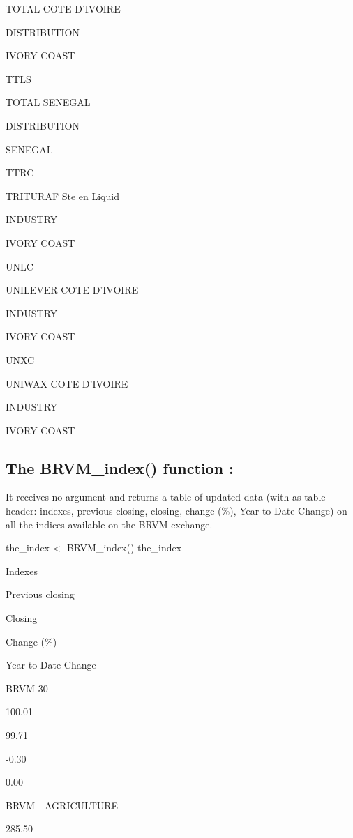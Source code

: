 \documentclass[
]{article}
\newenvironment{Shaded}{\begin{snugshade}}{\end{snugshade}}
\newcommand{\FunctionTok}[1]{\textcolor[rgb]{0.00,0.00,0.00}{#1}}
\newcommand{\NormalTok}[1]{#1}
\newcommand{\OtherTok}[1]{\textcolor[rgb]{0.56,0.35,0.01}{#1}}
\begin{document}
TOTAL COTE D'IVOIRE

DISTRIBUTION

IVORY COAST

TTLS

TOTAL SENEGAL

DISTRIBUTION

SENEGAL

TTRC

TRITURAF Ste en Liquid

INDUSTRY

IVORY COAST

UNLC

UNILEVER COTE D'IVOIRE

INDUSTRY

IVORY COAST

UNXC

UNIWAX COTE D'IVOIRE

INDUSTRY

IVORY COAST

\hypertarget{the-brvm_index-function}{%
\subsection{\texorpdfstring{The \textbf{BRVM\_index()} function
:}{The BRVM\_index() function :}}\label{the-brvm_index-function}}

It receives no argument and returns a table of updated data (with as
table header: indexes, previous closing, closing, change (\%), Year to
Date Change) on all the indices available on the BRVM exchange.

\begin{Shaded}
\begin{Highlighting}[]
\NormalTok{the\_index }\OtherTok{\textless{}{-}} \FunctionTok{BRVM\_index}\NormalTok{() }
\NormalTok{the\_index}
\end{Highlighting}
\end{Shaded}

Indexes

Previous closing

Closing

Change (\%)

Year to Date Change

BRVM-30

100.01

99.71

-0.30

0.00

BRVM - AGRICULTURE

285.50
\end{document}
